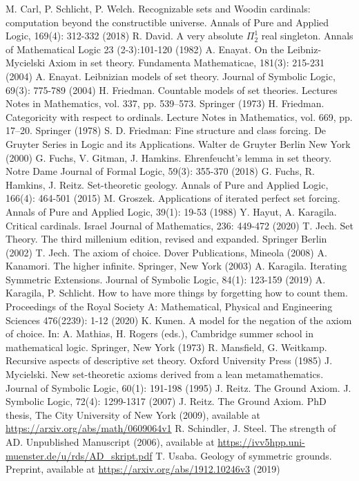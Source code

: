 \documentclass[a4paper,12pt]{amsart}
\theoremstyle{definition}
\begin{document}
\begin{thebibliography}{}
 M. Carl, P. Schlicht, P. Welch. Recognizable sets and Woodin cardinals: computation beyond the constructible universe. Annals of Pure and Applied Logic, 169(4): 312-332 (2018)
 R. David. A very absolute $\Pi^{1}_{2}$ real singleton. Annals of Mathematical Logic 23 (2-3):101-120 (1982) 
 A. Enayat. On the Leibniz-Mycielski Axiom in set theory. Fundamenta Mathematicae, 181(3): 215-231 (2004) 
 A. Enayat. Leibnizian models of set theory. Journal of Symbolic Logic, 69(3): 775-789 (2004)
 H. Friedman. Countable models of set theories. Lectures Notes in Mathematics, vol. 337, pp. 539--573. Springer (1973)
 H. Friedman. Categoricity with respect to ordinals. Lecture Notes in Mathematics, vol. 669, pp. 17--20. Springer (1978)
 S. D. Friedman: Fine structure and class forcing. De Gruyter Series in Logic and its Applications. Walter de Gruyter Berlin New York (2000)
 G. Fuchs, V. Gitman, J. Hamkins. Ehrenfeucht's lemma in set theory. Notre Dame Journal of Formal Logic, 59(3): 355-370 (2018) 
 G. Fuchs, R. Hamkins, J. Reitz. Set-theoretic geology. Annals of Pure and Applied Logic, 166(4): 464-501 (2015) 
  M. Groszek. Applications of iterated perfect set forcing. Annals of Pure and Applied Logic, 39(1): 19-53 (1988)
 Y. Hayut, A. Karagila. Critical cardinals. Israel Journal of Mathematics, 236: 449-472 (2020)
 T. Jech. Set Theory. The third millenium edition, revised and expanded. Springer Berlin (2002)
 T. Jech. The axiom of choice. Dover Publications, Mineola (2008)
 A. Kanamori. The higher infinite. Springer, New York (2003)
 A. Karagila. Iterating Symmetric Extensions. Journal of Symbolic Logic, 84(1): 123-159 (2019)
 A. Karagila, P. Schlicht. How to have more things by forgetting how to count them. Proceedings of the Royal Society A: Mathematical, Physical and Engineering Sciences 476(2239): 1-12 (2020) 
 K. Kunen. A model for the negation of the axiom of choice. In: A. Mathias, H. Rogers (eds.), Cambridge summer school in mathematical logic. Springer, New York (1973)
  R. Mansfield, G. Weitkamp. Recursive aspects of descriptive set theory. Oxford University Press (1985)
  J. Mycielski. New set-theoretic axioms derived from a lean metamathematics. Journal of Symbolic Logic, 60(1): 191-198 (1995) 
   J. Reitz. The Ground Axiom.  J. Symbolic Logic, 72(4): 1299-1317 (2007) 
  J. Reitz. The Ground Axiom. PhD thesis, The City University of New York (2009), available at \url{https://arxiv.org/abs/math/0609064v1}
  R. Schindler, J. Steel. The strength of AD. Unpublished Manuscript (2006), available at \url{https://ivv5hpp.uni-muenster.de/u/rds/AD_skript.pdf} 
  T. Usaba. Geology of symmetric grounds. Preprint, available at \url{https://arxiv.org/abs/1912.10246v3} (2019)
\end{thebibliography}
\end{document}
